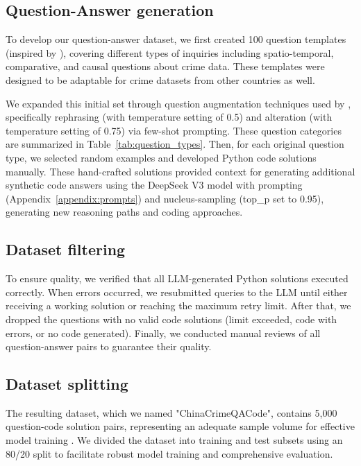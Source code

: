 \subsection{Question-Answer generation}

To develop our question-answer dataset, we first created 100 question templates (inspired by \cite{Dai2024QASTKG, Contractor2020QATourism}), covering different types of inquiries including spatio-temporal, comparative, and causal questions about crime data. These templates were designed to be adaptable for crime datasets from other countries as well.

We expanded this initial set through question augmentation techniques used by \cite{Yin2024MuMathCode, Li2024MuggleMath, Jain2024MetaFineTuning}, specifically rephrasing (with temperature setting of 0.5) and alteration (with temperature setting of 0.75) via few-shot prompting. These question categories are summarized in Table~\ref{tab:question_types}. Then, for each original question type, we selected random examples and developed Python code solutions manually. These hand-crafted solutions provided context for generating additional synthetic code answers using the DeepSeek V3 model with prompting (Appendix~\ref{appendix:prompts}) and nucleus-sampling \cite{Holtzman2020NucleusSampling, Ahmad2025OCRNVidia, Nvidia2024KaggleMath} (top\_p set to 0.95), generating new reasoning paths and coding approaches.

\subsection{Dataset filtering}

To ensure quality, we verified that all LLM-generated Python solutions executed correctly. When errors occurred, we resubmitted queries to the LLM until either receiving a working solution or reaching the maximum retry limit. After that, we dropped the questions with no valid code solutions (limit exceeded, code with errors, or no code generated). Finally, we conducted manual reviews of all question-answer pairs to guarantee their quality.

\subsection{Dataset splitting}

The resulting dataset, which we named "ChinaCrimeQACode", contains 5,000 question-code solution pairs, representing an adequate sample volume for effective model training \cite{Unsloth2024Dataset1}. We divided the dataset into training and test subsets using an 80/20 split to facilitate robust model training and comprehensive evaluation.

